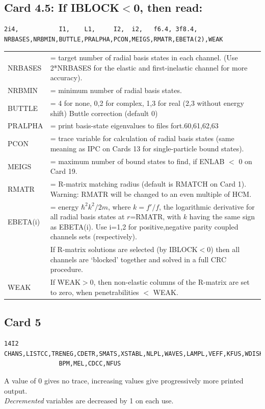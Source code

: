 \documentclass[11pt]{book}
\begin{document}
\subsection{Card 4.5: If IBLOCK$<$0, then read:}
\begin{verbatim}
2i4,           I1,    L1,     I2,  i2,   f6.4, 3f8.4,
NRBASES,NRBMIN,BUTTLE,PRALPHA,PCON,MEIGS,RMATR,EBETA(2),WEAK
\end{verbatim}

\begin{longtable}{| p{} | p{} |} 
\hline 
NRBASES & = target number of radial basis states in each channel.
(Use 2*NRBASES for the elastic and first-inelastic channel for more accuracy).\\
NRBMIN & = minimum number of radial basis states. \\
BUTTLE & = 4 for none, 0,2 for complex, 1,3 for real
(2,3 without energy shift) Buttle correction (default 0) \\
PRALPHA & = print basis-state eigenvalues to files fort.60,61,62,63 \\
PCON & = trace variable for calculation of radial basis states (same
meaning as IPC on Cards 13 for single-particle bound states). \\
MEIGS & = maximum number of bound states to find, if ENLAB $<$ 0 on Card 19.\\
RMATR & = R-matrix matching radius (default is RMATCH on Card 1).
Warning: RMATR will be changed to an even multiple of HCM. \\
EBETA(i) & = energy $\hbar^2k^2/2m$, where $k= f'/f$, the logarithmic derivative
for all radial basis states at $r$=RMATR, with $k$ having the same
sign as EBETA(i). Use i=1,2 for positive,negative parity coupled channels
sets (respectively). \\
  & If R-matrix solutions are selected (by IBLOCK$<$0) then all channels
are `blocked' together and solved in a full CRC procedure. \\
WEAK & If WEAK$>$0, then non-elastic columns of the R-matrix are set to zero,
  when penetrabilities $<$ WEAK. \\
\hline 
\end{longtable}

\subsection{Card 5}
\begin{verbatim}
14I2
CHANS,LISTCC,TRENEG,CDETR,SMATS,XSTABL,NLPL,WAVES,LAMPL,VEFF,KFUS,WDISK,
               BPM,MEL,CDCC,NFUS
\end{verbatim}
A value of 0 gives no trace,
increasing values give progressively more printed output.
\\
{\em Decremented} variables are decreased by 1 on each use.
\end{document}
